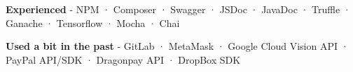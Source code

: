 \begin{cventries}
{\begin{cvitems}
        \item {\textbf{Experienced} \hspace{0.03cm} - \hspace{0.03cm} NPM \hspace{0.03cm} · \hspace{0.03cm} Composer \hspace{0.03cm} · \hspace{0.03cm} Swagger \hspace{0.03cm} · \hspace{0.03cm} JSDoc \hspace{0.03cm} · \hspace{0.03cm} JavaDoc \hspace{0.03cm} · \hspace{0.03cm} Truffle \hspace{0.03cm} · \hspace{0.03cm} Ganache \hspace{0.03cm} · \hspace{0.03cm} Tensorflow \hspace{0.03cm} · \hspace{0.03cm} Mocha \hspace{0.03cm} · \hspace{0.03cm} Chai} %
        \item {\textbf{Used a bit in the past} \hspace{0.03cm} - \hspace{0.03cm} GitLab \hspace{0.03cm} · \hspace{0.03cm} MetaMask \hspace{0.03cm} · \hspace{0.03cm} Google Cloud Vision API \hspace{0.03cm} · \hspace{0.03cm} PayPal API/SDK \hspace{0.03cm} · \hspace{0.03cm} Dragonpay API \hspace{0.03cm} · \hspace{0.03cm} DropBox SDK \\} %
      \end{cvitems}
    }

\end{cventries}